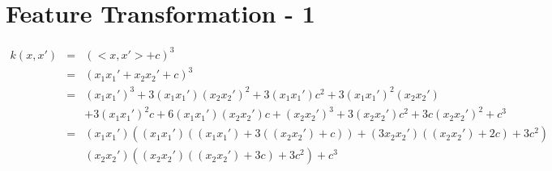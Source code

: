 \section*{Feature Transformation - 1} 
\begin{eqnarray}
    k(x,x')&=&\left(<x,x'> + c \right)^3 \\
    &=&\left(x_1x_1'+x_2x_2'+ c \right)^3 \\
    &=&(x_1x_1')^3 + 3(x_1x_1')(x_2x_2')^2 + 3(x_1x_1')c^2 + 3(x_1x_1')^2(x_2x_2')  \\ \nonumber
    && + 3(x_1x_1')^2c  + 6(x_1x_1')(x_2x_2')c + (x_2x_2')^3 + 3 (x_2x_2')c^2 + 3 c (x_2x_2')^2 + c^3\\
    &=& (x_1x_1')((x_1x_1')((x_1x_1') + 3((x_2x_2') + c)) + (3x_2x_2')((x_2x_2') + 2c) + 3c^2)  \\ \nonumber
    && (x_2x_2')((x_2x_2')((x_2x_2') + 3 c)+ 3c^2) + c^3
\end{eqnarray}